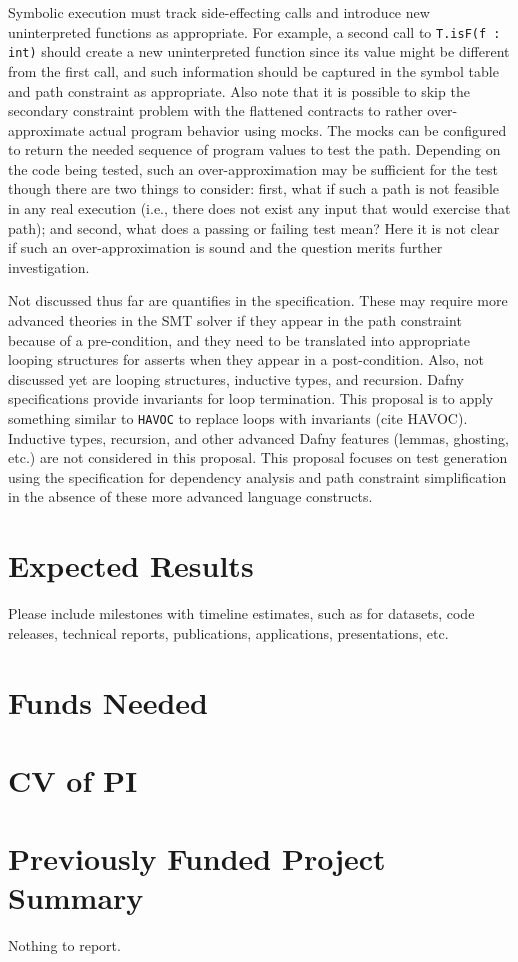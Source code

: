\documentclass[11pt,onecolumn,notitlepage]{article}
\begin{document}
Symbolic execution must track side-effecting calls and introduce new uninterpreted functions as appropriate. For example, a second call to \texttt{T.isF(f : int)} should create a new uninterpreted function since its value might be different from the first call, and such information should be captured in the symbol table and path constraint as appropriate. Also note that it is possible to skip the secondary constraint problem with the flattened contracts to rather over-approximate actual program behavior using mocks. The mocks can be configured to return the needed sequence of program values to test the path. Depending on the code being tested, such an over-approximation may be sufficient for the test though there are two things to consider: first, what if such a path is not feasible in any real execution (i.e., there does not exist any input that would exercise that path); and second, what does a passing or failing test mean? Here it is not clear if such an over-approximation is sound and the question merits further investigation.

Not discussed thus far are quantifies in the specification. These may require more advanced theories in the SMT solver if they appear in the path constraint because of a pre-condition, and they need to be translated into appropriate looping structures for asserts when they appear in a post-condition.  Also, not discussed yet are looping structures, inductive types, and recursion. Dafny specifications provide invariants for loop termination. This proposal is to apply something similar to \texttt{HAVOC} to replace loops with invariants (cite HAVOC). Inductive types, recursion, and other advanced Dafny features (lemmas, ghosting, etc.) are not considered in this proposal. This proposal focuses on test generation using the specification for dependency analysis and path constraint simplification in the absence of these more advanced language constructs.

\section*{Expected Results}
Please include milestones with timeline estimates, such as for datasets, code releases, technical reports, publications, applications, presentations, etc. 

\section*{Funds Needed}

\appendix
\appendixpage




\section{CV of PI}

\section{Previously Funded Project Summary}
Nothing to report.
\end{document}

